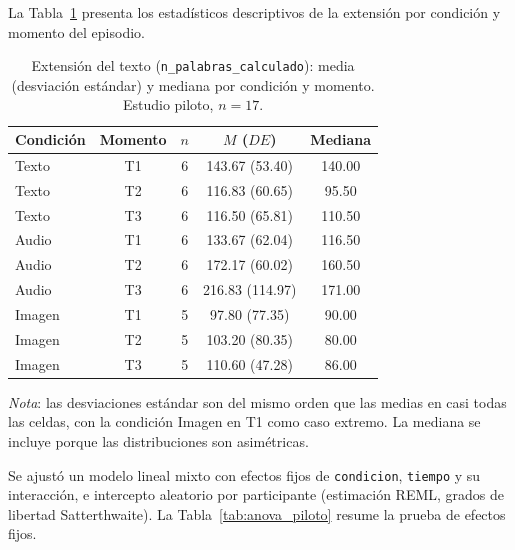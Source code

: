 \documentclass[12pt]{article}
\begin{document}
	La Tabla~\ref{tab:desc_piloto} presenta los estadísticos descriptivos de la extensión por condición y momento del episodio.
	
	\begin{table}[H]
		\centering
		\caption{Extensión del texto (\texttt{n\_palabras\_calculado}): media (desviación estándar) y mediana por condición y momento. Estudio piloto, $n = 17$.}
		\label{tab:desc_piloto}
		\begin{tabular}{l c c c c}
			\toprule
			Condición & Momento & $n$ & $M$ ($DE$) & Mediana \\
			\midrule
			Texto  & T1 & 6 & 143.67 (53.40) & 140.00 \\
			Texto  & T2 & 6 & 116.83 (60.65) &  95.50 \\
			Texto  & T3 & 6 & 116.50 (65.81) & 110.50 \\
			\midrule
			Audio  & T1 & 6 & 133.67 (62.04) & 116.50 \\
			Audio  & T2 & 6 & 172.17 (60.02) & 160.50 \\
			Audio  & T3 & 6 & 216.83 (114.97) & 171.00 \\
			\midrule
			Imagen & T1 & 5 &  97.80 (77.35) &  90.00 \\
			Imagen & T2 & 5 & 103.20 (80.35) &  80.00 \\
			Imagen & T3 & 5 & 110.60 (47.28) &  86.00 \\
			\bottomrule
		\end{tabular}
		\par\smallskip
		\noindent\begin{minipage}{\textwidth}
			\footnotesize
			\emph{Nota}: las desviaciones estándar son del mismo orden que las medias en casi todas las celdas, con la condición Imagen en T1 como caso extremo. La mediana se incluye porque las distribuciones son asimétricas.
		\end{minipage}
	\end{table}
	
	\vspace{0.5\baselineskip} %
	
	Se ajustó un modelo lineal mixto con efectos fijos de \texttt{condicion}, \texttt{tiempo} y su interacción, e intercepto aleatorio por participante (estimación REML, grados de libertad Satterthwaite). La Tabla~\ref{tab:anova_piloto} resume la prueba de efectos fijos.
	
\end{document}
